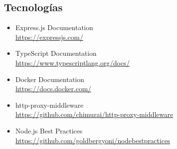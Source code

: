 \documentclass[12pt,a4paper]{article}
\begin{document}
\subsection{Tecnologías}

\begin{itemize}[leftmargin=*]
    \item Express.js Documentation \\
    \url{https://expressjs.com/}

    \item TypeScript Documentation \\
    \url{https://www.typescriptlang.org/docs/}

    \item Docker Documentation \\
    \url{https://docs.docker.com/}

    \item http-proxy-middleware \\
    \url{https://github.com/chimurai/http-proxy-middleware}

    \item Node.js Best Practices \\
    \url{https://github.com/goldbergyoni/nodebestpractices}
\end{itemize}

\end{document}
